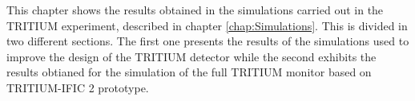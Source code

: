 This chapter shows the results obtained in the simulations carried out in the TRITIUM experiment, described in chapter \ref{chap:Simulations}. This is divided in two different sections. The first one presents the results of the simulations used to improve the design of the TRITIUM detector while the second exhibits the results obtianed for the simulation of the full TRITIUM monitor based on TRITIUM-IFIC 2 prototype.